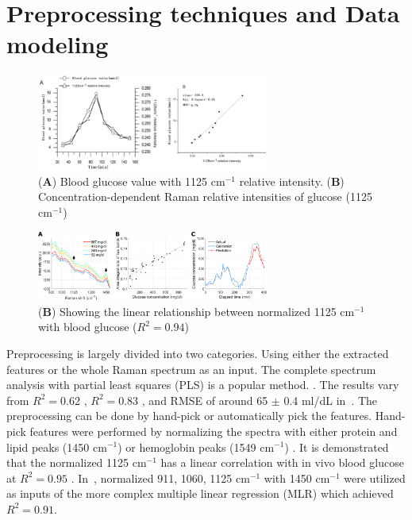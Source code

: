 \section{Preprocessing techniques and Data modeling}

\begin{figure}
    \caption{(\textbf{A}) Blood glucose value with 1125 $\text{cm}^{-1}$ relative intensity. (\textbf{B}) Concentration-dependent Raman relative intensities of glucose (1125 $\text{cm}^{-1}$) \citep{solutionGlucose}}
    \centerline{\includegraphics[width=3in]{figures/bloodGlucose-relative1125.png}}\label{fig:bloodGlucose-relative1125}
\end{figure}

\begin{figure}
    \caption{(\textbf{B}) Showing the linear relationship between normalized 1125 $\text{cm}^{-1}$ with blood glucose ($R^2 = 0.94$) \citep{directGlucose}}
    \centerline{\includegraphics[width=3in]{figures/bloodGlucose-relative1125-directGlucose.jpeg}}\label{fig:bloodGlucose-relative1125-directGlucose}
\end{figure}

Preprocessing is largely divided into two categories. 
Using either the extracted features or the whole Raman spectrum as an input.
The complete spectrum analysis with partial least squares (PLS) is a popular method. \citep{forearm2014, sitecompare, forearm2005, directGlucose}.
The results vary from $R^2 = 0.62$ \citep{directGlucose}, $R^2 = 0.83$ \citep{forearm2005,forearm2014}, and RMSE of around 65 $\pm$ 0.4 ml/dL in~\cite{sitecompare}.
The preprocessing can be done by hand-pick \citep{directGlucose,solutionGlucose} or automatically \citep{ramanNailFold2019, sitecompare} pick the features.
Hand-pick features were performed by normalizing the spectra with either protein and lipid peaks (1450 $\text{cm}^{-1}$) \citep{directGlucose} or hemoglobin peaks (1549 $\text{cm}^{-1}$) \citep{solutionGlucose}.
It is demonstrated that the normalized 1125 $\text{cm}^{-1}$ has a linear correlation with in vivo blood glucose at $R^2 = 0.95$ \citep{solutionGlucose}.
In~\cite{directGlucose}, normalized 911, 1060, 1125 $\text{cm}^{-1}$ with 1450 $\text{cm}^{-1}$ were utilized as inputs of the more complex multiple linear regression (MLR) which achieved $R^2 = 0.91$.
